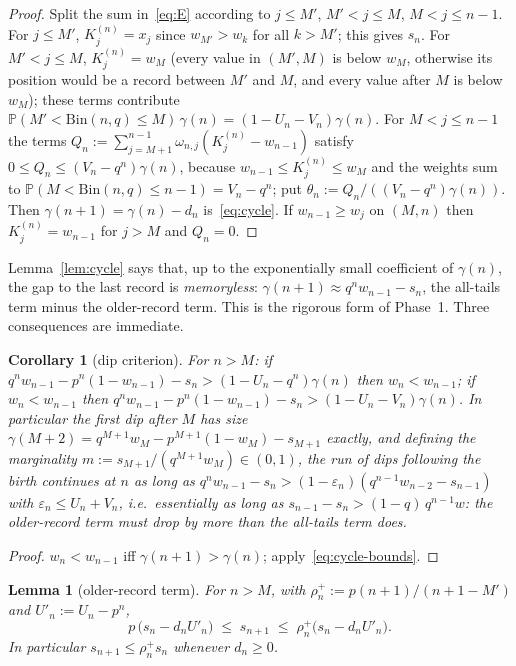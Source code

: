 \documentclass[11pt]{article}
\newtheorem{lemma}[theorem]{Lemma}
\newtheorem{corollary}[theorem]{Corollary}
\theoremstyle{definition}
\newcommand{\Bin}{\mathrm{Bin}}
\newcommand{\Prob}{\mathbb{P}}
\begin{document}
\begin{proof}
  Split the sum in~\eqref{eq:E} according to $j\le M'$, $M'<j\le M$,
  $M<j\le n-1$.  For $j\le M'$, $K^{(n)}_j=x_j$ since
  $w_{M'}>w_k$ for all $k>M'$; this gives $s_n$.  For $M'<j\le M$,
  $K^{(n)}_j=w_M$ (every value in $(M',M)$ is below $w_M$, otherwise
  its position would be a record between $M'$ and $M$, and every value
  after $M$ is below $w_M$); these terms contribute
  $\Prob(M'<\Bin(n,q)\le M)\,\gamma(n)=(1-U_n-V_n)\gamma(n)$.  For
  $M<j\le n-1$ the terms $Q_n:=\sum_{j=M+1}^{n-1}\omega_{n,j}
  (K^{(n)}_j-w_{n-1})$ satisfy $0\le Q_n\le(V_n-q^n)\gamma(n)$, because
  $w_{n-1}\le K^{(n)}_j\le w_M$ and the weights sum to
  $\Prob(M<\Bin(n,q)\le n-1)=V_n-q^n$; put
  $\theta_n:=Q_n/((V_n-q^n)\gamma(n))$.  Then
  $\gamma(n+1)=\gamma(n)-d_n$ is~\eqref{eq:cycle}.  If
  $w_{n-1}\ge w_j$ on $(M,n)$ then $K^{(n)}_j=w_{n-1}$ for $j>M$ and
  $Q_n=0$.
\end{proof}

Lemma~\ref{lem:cycle} says that, up to the exponentially small
coefficient of $\gamma(n)$, the gap to the last record is
\emph{memoryless}: $\gamma(n+1)\approx q^nw_{n-1}-s_n$, the all-tails
term minus the older-record term.  This is the rigorous form of
Phase~1.  Three consequences are immediate.

\begin{corollary}[dip criterion]\label{cor:dip}
  For $n>M$: if $q^nw_{n-1}-p^n(1-w_{n-1})-s_n>(1-U_n-q^n)\gamma(n)$
  then $w_n<w_{n-1}$; if $w_n<w_{n-1}$ then
  $q^nw_{n-1}-p^n(1-w_{n-1})-s_n>(1-U_n-V_n)\gamma(n)$.  In particular
  the first dip after $M$ has size $\gamma(M+2)=q^{M+1}w_M-p^{M+1}(1-w_M)-s_{M+1}$
  exactly, and defining the \emph{marginality}
  $m:=s_{M+1}/(q^{M+1}w_M)\in(0,1)$, the run of dips following the birth
  continues at $n$ as long as
  $q^nw_{n-1}-s_n>(1-\varepsilon_n)(q^{n-1}w_{n-2}-s_{n-1})$ with
  $\varepsilon_n\le U_n+V_n$, i.e.\ essentially as long as
  $s_{n-1}-s_n>(1-q)\,q^{n-1}w$: the older-record term must drop by more
  than the all-tails term does.
\end{corollary}

\begin{proof}
  $w_n<w_{n-1}$ iff $\gamma(n+1)>\gamma(n)$; apply~\eqref{eq:cycle-bounds}.
\end{proof}

\begin{lemma}[older-record term]\label{lem:older}
  For $n>M$, with $\rho^+_n:=p(n+1)/(n+1-M')$ and $U'_n:=U_n-p^n$,
  \[
    p\,\bigl(s_n-d_nU'_n\bigr)\;\le\;s_{n+1}\;\le\;\rho^+_n\bigl(s_n-d_nU'_n\bigr).
  \]
  In particular $s_{n+1}\le\rho^+_n s_n$ whenever $d_n\ge0$.
\end{lemma}
\end{document}
